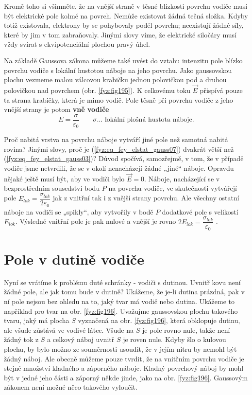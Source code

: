 {  Kromě toho si všimněte, že na vnější straně v těsné blízkosti povrchu vodiče musí být 
  elektrické pole kolmé na povrch. Nemůže existovat žádná tečná složka. Kdyby totiž existovala, 
  elektrony by se pohybovaly podél povrchu; neexistují žádné síly, které by jim v tom 
  zabraňovaly. Jinými slovy víme, že elektrické siločáry musí vždy svírat s ekvipotenciální 
  plochou pravý úhel.
  
  Na základě Gaussova zákona můžeme také uvést do vztahu intenzitu pole blízko povrchu vodiče s 
  lokální hustotou náboje na jeho povrchu. Jako gaussovskou plochu vezmeme malou válcovou 
  krabičku jednou polovičkou pod a druhou polovičkou nad povrchem (obr. 
  \ref{fyz:fig195}). K celkovému toku \(\vec{E}\) přispívá pouze ta strana 
  krabičky, která je mimo vodič. Pole těsně při povrchu vodiče z jeho vnější strany je potom 
  \textbf{vně vodiče}
  \begin{equation}\label{fyz:eq_fey_elstat_gauss07}
    E = \frac{\sigma}{\varepsilon_0}  \qquad\text{\(\sigma\ldots\) lokální plošná hustota 
    náboje}.
  \end{equation}
  
  Proč nabitá vrstva na povrchu náboje vytváří jiné pole než samotná nabitá rovina? Jinými 
  slovy, proč je (\ref{fyz:eq_fey_elstat_gauss07}) dvakrát větší než 
  (\ref{fyz:eq_fey_elstat_gauss03})? Důvod spočívá, samozřejmě, v tom, že v případě vodiče jsme 
  netvrdili, že se v okolí nenacházejí žádné „jiné“ náboje. Opravdu nějaké ještě musí být, aby 
  ve vodiči bylo \(\vec{E} = 0\). Náboje, nacházející se v bezprostředním sousedství bodu \(P\) 
  na povrchu vodiče, ve skutečnosti vytvářejí pole \(E_{lok}= 
  \dfrac{\sigma_{lok}}{2\varepsilon_0}\) jak z vnitřní tak i z vnější strany povrchu. Ale 
  všechny ostatní náboje na vodiči se „spikly“, aby vytvořily v bodě \(P\) dodatkové pole s 
  velikostí \(E_{lok}\). Výsledné vnitřní pole je pak nulové a vnější je rovno \(2E_{lok} = 
  \dfrac{\sigma_{lok}}{\varepsilon_0}\) \cite[s.~93]{Feynman02}.
  
\section{Pole v dutině vodiče}\label{fyz:IIchapVsecIX}
  Nyní se vrátíme k problému duté schránky - vodiči s dutinou. Uvnitř kovu není žádné pole, ale 
  jak tomu bude v dutině? Ukážeme, že je-li dutina prázdná, pak v ní pole nejsou bez ohledu na 
  to, jaký tvar má vodič nebo dutina. Ukážeme to například pro tvar na obr. \ref{fyz:fig196}. 
  Uvažujme gaussovskou plochu takového tvaru, jaký má plocha \(S\) vyznačená na obr. 
  \ref{fyz:fig196}, která obklopuje dutinu, ale všude zůstává ve vodivé látce. Všude na \(S\) je 
  pole rovno nule, takže není žádný tok z \(S\) a celkový náboj uvnitř \(S\) je roven nule. Kdyby 
  šlo o kulovou plochu, by bylo možno ze souměrnosti usoudit, že v jejím nitru by nemohl být žádný 
  náboj. Ale obecně můžeme pouze tvrdit, že na vnitřním povrchu vodiče je stejné množství kladného 
  a záporného náboje. Kladný povrchový náboj by mohl být v jedné jeho části a záporný někde jinde, 
  jako na obr. \ref{fyz:fig196}. Gaussovým zákonem není možné něco takového vyloučit.
  
}
